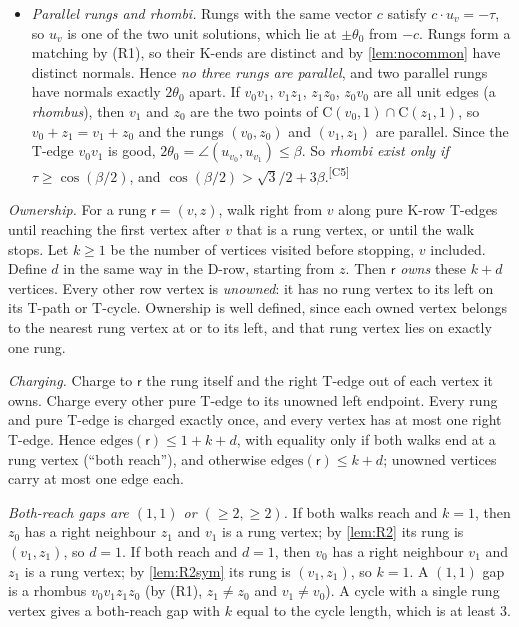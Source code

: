 \documentclass[11pt]{amsart}
\theoremstyle{definition}
\theoremstyle{remark}
\newcommand{\Cc}{\mathrm{C}}      %
\newcommand{\chk}[1]{\textsuperscript{[#1]}}
\begin{document}
\begin{itemize}[leftmargin=2em]
\item[(R3)] \emph{Parallel rungs and rhombi.} Rungs with the same vector $c$ satisfy $c\cdot u_v=-\tau$, so $u_v$ is one of the two unit solutions, which lie at $\pm\theta_0$ from $-c$. Rungs form a matching by (R1), so their K-ends are distinct and by \cref{lem:nocommon} have distinct normals. Hence \emph{no three rungs are parallel}, and two parallel rungs have normals exactly $2\theta_0$ apart. If $v_0v_1$, $v_1z_1$, $z_1z_0$, $z_0v_0$ are all unit edges (a \emph{rhombus}), then $v_1$ and $z_0$ are the two points of $\Cc(v_0,1)\cap\Cc(z_1,1)$, so $v_0+z_1=v_1+z_0$ and the rungs $(v_0,z_0)$ and $(v_1,z_1)$ are parallel. Since the T-edge $v_0v_1$ is good, $2\theta_0=\angle(u_{v_0},u_{v_1})\le\beta$. So \emph{rhombi exist only if $\tau\ge\cos(\beta/2)$}, and $\cos(\beta/2)>\sqrt3/2+3\beta$.\chk{C5}
\end{itemize}

\emph{Ownership.} For a rung $\mathsf r=(v,z)$, walk right from $v$ along pure K-row T-edges until reaching the first vertex after $v$ that is a rung vertex, or until the walk stops. Let $k\ge1$ be the number of vertices visited before stopping, $v$ included. Define $d$ in the same way in the D-row, starting from $z$. Then $\mathsf r$ \emph{owns} these $k+d$ vertices. Every other row vertex is \emph{unowned}: it has no rung vertex to its left on its T-path or T-cycle. Ownership is well defined, since each owned vertex belongs to the nearest rung vertex at or to its left, and that rung vertex lies on exactly one rung.

\emph{Charging.} Charge to $\mathsf r$ the rung itself and the right T-edge out of each vertex it owns. Charge every other pure T-edge to its unowned left endpoint. Every rung and pure T-edge is charged exactly once, and every vertex has at most one right T-edge. Hence $\mathrm{edges}(\mathsf r)\le1+k+d$, with equality only if both walks end at a rung vertex (``both reach''), and otherwise $\mathrm{edges}(\mathsf r)\le k+d$; unowned vertices carry at most one edge each.

\emph{Both-reach gaps are $(1,1)$ or $(\ge2,\ge2)$.} If both walks reach and $k=1$, then $z_0$ has a right neighbour $z_1$ and $v_1$ is a rung vertex; by \cref{lem:R2} its rung is $(v_1,z_1)$, so $d=1$. If both reach and $d=1$, then $v_0$ has a right neighbour $v_1$ and $z_1$ is a rung vertex; by \cref{lem:R2sym} its rung is $(v_1,z_1)$, so $k=1$. A $(1,1)$ gap is a rhombus $v_0v_1z_1z_0$ (by (R1), $z_1\neq z_0$ and $v_1\neq v_0$). A cycle with a single rung vertex gives a both-reach gap with $k$ equal to the cycle length, which is at least $3$.
\end{document}
